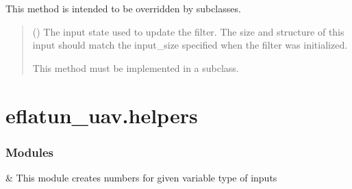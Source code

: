 \documentclass[letterpaper,10pt,english]{sphinxmanual}
\begin{document}
\begin{fulllineitems}
\begin{fulllineitems}
\sphinxAtStartPar
This method is intended to be overridden by subclasses.
\begin{quote}\begin{description}
\sphinxAtStartPar
{} () \textendash{} The input state used to update the filter. The size and structure of this
input should match the input\_size specified when the filter was initialized.

\sphinxAtStartPar
{} \textendash{} This method must be implemented in a subclass.

\end{description}\end{quote}

\end{fulllineitems}


\end{fulllineitems}


\sphinxstepscope


\section{eflatun\_uav.helpers}
\label{\detokenize{generated/eflatun_uav.helpers:module-eflatun_uav.helpers}}\label{\detokenize{generated/eflatun_uav.helpers:eflatun-uav-helpers}}\label{\detokenize{generated/eflatun_uav.helpers::doc}}\subsubsection*{Modules}


\begin{savenotes}\sphinxattablestart
\sphinxthistablewithglobalstyle
\sphinxthistablewithnovlinesstyle
\centering
\begin{tabulary}{\linewidth}[t]{}
\sphinxtoprule
\sphinxtableatstartofbodyhook
\sphinxAtStartPar
{\hyperref[\detokenize{generated/eflatun_uav.helpers.number_generators:module-eflatun_uav.helpers.number_generators}]{}}
&
\sphinxAtStartPar
This module creates numbers for given variable type of inputs
\\
\sphinxbottomrule
\end{tabulary}
\sphinxtableafterendhook\par
\sphinxattableend\end{savenotes}
\end{document}
